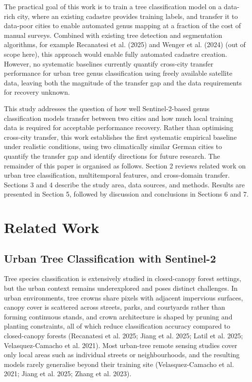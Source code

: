 \documentclass[11pt,a4paper]{scrartcl}
\begin{document}
The practical goal of this work is to train a tree classification model
on a data-rich city, where an existing cadastre provides training
labels, and transfer it to data-poor cities to enable automated genus
mapping at a fraction of the cost of manual surveys. Combined with
existing tree detection and segmentation algorithms, for example
Recanatesi et al. (2025) and Wenger et al. (2024) (out of scope here),
this approach would enable fully automated cadastre creation. However,
no systematic baselines currently quantify cross-city transfer
performance for urban tree genus classification using freely available
satellite data, leaving both the magnitude of the transfer gap and the
data requirements for recovery unknown.

This study addresses the question of how well Sentinel-2-based genus
classification models transfer between two cities and how much local
training data is required for acceptable performance recovery. Rather
than optimising cross-city transfer, this work establishes the first
systematic empirical baseline under realistic conditions, using two
climatically similar German cities to quantify the transfer gap and
identify directions for future research. The remainder of this paper is
organised as follows. Section 2 reviews related work on urban tree
classification, multitemporal features, and cross-domain transfer.
Sections 3 and 4 describe the study area, data sources, and methods.
Results are presented in Section 5, followed by discussion and
conclusions in Sections 6 and 7.

\section{Related Work}\label{related-work}

\subsection{Urban Tree Classification with
Sentinel-2}\label{urban-tree-classification-with-sentinel-2}

Tree species classification is extensively studied in closed-canopy
forest settings, but the urban context remains underexplored and poses
distinct challenges. In urban environments, tree crowns share pixels
with adjacent impervious surfaces, canopy cover is scattered across
streets, parks, and courtyards rather than forming continuous stands,
and crown architecture is shaped by pruning and planting constraints,
all of which reduce classification accuracy compared to closed-canopy
forests (Recanatesi et al. 2025; Jiang et al. 2025; Latil et al. 2025;
{Velasquez-Camacho et al.} 2021). Most urban-tree remote sensing studies
cover only local areas such as individual streets or neighbourhoods, and
the resulting models rarely generalise beyond their training site
({Velasquez-Camacho et al.} 2021; Jiang et al. 2025; Zhang et al. 2023).
\end{document}
